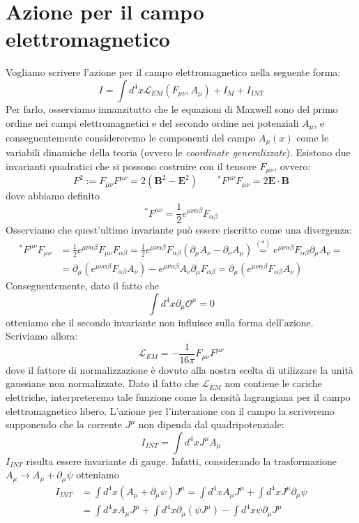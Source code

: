 \documentclass[a4paper,11pt]{book}
\theoremstyle{plain}
\theoremstyle{definition}
\begin{document}
\section{Azione per il campo elettromagnetico}
Vogliamo scrivere l'azione per il campo elettromagnetico nella seguente forma:
\[
I = \int d^4 x \mathcal{L}_{EM}(F_{\mu\nu}, A_{\mu}) + I_{M} + I_{INT}
\]
Per farlo, osserviamo innanzitutto che le equazioni di Maxwell sono del primo ordine nei campi elettromagnetici e del secondo ordine nei potenziali $A_{\mu}$, e conseguentemente considereremo le componenti del campo $A_{\mu}(x)$ come le variabili dinamiche della teoria (ovvero le \emph{coordinate generalizzate}). Esistono due invarianti quadratici che si possono costruire con il tensore $F_{\mu\nu}$, ovvero:
\[
F^2 := F_{\mu\nu}F^{\mu\nu} = 2(\textbf{B}^2-\textbf{E}^2) \qquad ^*F^{\mu\nu}F_{\mu\nu} = 2\textbf{E}\cdot\textbf{B}
\]
dove abbiamo definito
\[
^*F^{\mu\nu}=\frac{1}{2}e^{\mu\nu\alpha\beta}F_{\alpha\beta}
\]
Osserviamo che quest'ultimo invariante può essere riscritto come una divergenza:
\begin{align*}
^*F^{\mu\nu}F_{\mu\nu} &=\frac{1}{2}e^{\mu\nu\alpha\beta}F_{\mu\nu}F_{\alpha\beta}=\frac{1}{2}e^{\mu\nu\alpha\beta}F_{\alpha\beta}(\partial_{\mu}A_{\nu}-\partial_{\nu}A_{\mu}) \overset{(*)}{=}e^{\mu\nu\alpha\beta}F_{\alpha\beta}\partial_{\mu}A_{\nu} = \\
&=\partial_{\mu}(e^{\mu\nu\alpha\beta}F_{\alpha\beta}A_{\nu}) - e^{\mu\nu\alpha\beta}A_{\nu}\partial_{\mu}F_{\alpha\beta} = \partial_{\mu}(e^{\mu\nu\alpha\beta}F_{\alpha\beta}A_{\nu})
\end{align*}
Conseguentemente, dato il fatto che
\[
\int d^4x\partial_{\mu}\mathcal{O}^{\mu} = 0
\]
otteniamo che il secondo invariante non influisce sulla forma dell'azione. Scriviamo allora:
\[
\mathcal{L}_{EM} = -\frac{1}{16\pi}F_{\mu\nu}F^{\mu\nu}
\]
dove il fattore di normalizzazione è dovuto alla nostra scelta di utilizzare la unità gaussiane non normalizzate. Dato il fatto che $\mathcal{L}_{EM}$ non contiene le cariche elettriche, interpreteremo tale funzione come la densità lagrangiana per il campo elettromagnetico libero. L'azione per l'interazione con il campo la scriveremo supponendo che la corrente $J^{\mu}$ non dipenda dal quadripotenziale:
\[
I_{INT} = \int d^4 x J^{\mu}A_{\mu}
\]
$I_{INT}$ risulta essere invariante di gauge. Infatti, considerando la trasformazione $A_{\mu} \to A_{\mu} + \partial_{\mu}\psi$ otteniamo
\begin{align*}
I_{INT} &= \int d^4x(A_{\mu}+\partial_{\mu}\psi)J^{\mu} = \int d^4 x A_{\mu}J^{\mu}+\int d^4x J^{\mu}\partial_{\mu}\psi \\
&=\int d^4 x A_{\mu}J^{\mu}+\int d^4 x \partial_{\mu}(\psi J^{\mu}) - \int d^4x \psi\partial_{\mu}J^{\mu}
\end{align*}
\end{document}
